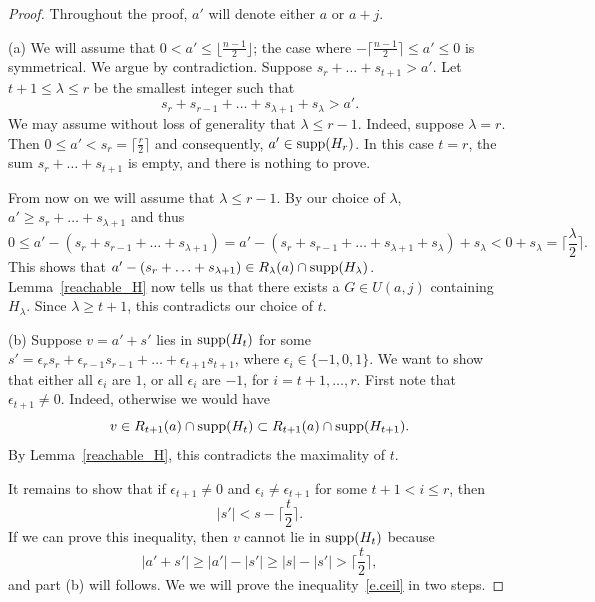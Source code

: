 \documentclass{amsproc}
\theoremstyle{definition}
\theoremstyle{remark}
\numberwithin{equation}{section}
\newcommand{\supp}{{\rm supp}}
\begin{document}
\begin{proof} Throughout the proof, $a'$ will denote either $a$ or $a + j$.

\smallskip
(a) We will assume that $0  < a' \leqslant \lfloor \frac{n-1}{2} \rfloor$; the case where  
$- \lceil \frac{n-1}{2} \rceil \leqslant a' \leqslant 0$ is symmetrical. We argue by contradiction. Suppose $s_r + \ldots + s_{t + 1} > a'$.
Let $t + 1 \leqslant \lambda \leqslant r$ be the smallest integer such that 
\begin{equation} \label{e.reachable}
s_r + s_{r-1} + \ldots + s_{\lambda+ 1} + s_{\lambda} > a'.
\end{equation}
We may assume without loss of generality that $\lambda \leqslant r-1$. 
Indeed, suppose $\lambda = r$. Then $0 \leqslant a' < s_r = \lceil \frac{r}{2} \rceil$ and consequently, $a' \in \supp(H_r)$. In this case
$t = r$, the sum $s_r + \ldots + s_{t + 1}$ is empty, and there is nothing to prove. 

   From now on we will assume that $\lambda \leqslant r -1$. By our choice of $\lambda$, $a' \geqslant s_r + \ldots + s_{\lambda + 1}$ and thus
\[ 0\leqslant a' - (s_r + s_{r-1} +  \ldots + s_{\lambda + 1}) = a' - (s_r + s_{r-1} + \ldots + s_{\lambda + 1} + s_{\lambda}) + s_{\lambda} < 
0 + s_{\lambda} = \lceil \frac{\lambda}{2} \rceil. \]
This shows that $a' - (s_r + \ldots + s_{\lambda + 1}) \in R_{\lambda}(a)  \cap \supp( H_{\lambda})$.  
Lemma~\ref{reachable_H} now tells us that there exists a $G \in U(a, j)$ containing $H_{\lambda}$.
Since $\lambda \geqslant t + 1$, this contradicts our choice of $t$.

\smallskip
(b) Suppose $v = a' + s'$ lies in $\supp(H_t)$ for some $s' = \epsilon_r s_r + \epsilon_{r-1} s_{r-1} + \ldots + \epsilon_{t + 1} s_{t + 1}$,
where $\epsilon_i  \in \{ - 1, 0, 1 \}$. We want to show that either all $\epsilon_i$ are $1$, or all $\epsilon_i$ are $-1$, for $i=t+1,\dots,r$.
First note that $\epsilon_{t + 1} \neq 0$. Indeed, otherwise we would have
\[ v \in R_{t + 1}(a) \cap \supp(H_t) \subset R_{t+1}(a) \cap \supp(H_{t + 1}). \]
By Lemma~\ref{reachable_H}, this contradicts the maximality of $t$.

It remains to show that if $\epsilon_{t + 1} \neq 0$ and $\epsilon_i\neq \epsilon_{t+1}$ for some $t+1<i\leqslant r$, then
\begin{equation} \label{e.ceil} |s'| < s - \lceil \dfrac{t}{2} \rceil. \end{equation}  
If we can prove this inequality, then $v$ cannot lie in $\supp(H_t)$ because
\[ |a' + s'| \geqslant |a'| - |s'| \geqslant |s| - |s'| > \lceil \dfrac{t}{2} \rceil, \]
and part (b) will follows.
We we will prove the inequality~\eqref{e.ceil} in two steps. 


\end{proof}
\end{document}
